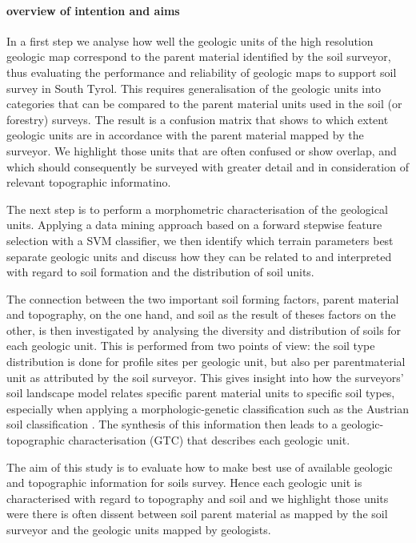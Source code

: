 \documentclass[preprint,12pt,authoryear]{elsarticle}
\begin{document}
\paragraph{overview of intention and aims}
In a first step we analyse how well the geologic units of the high resolution geologic map correspond to the parent material identified by the soil surveyor, thus evaluating the performance and reliability of geologic maps to support soil survey in South Tyrol. This requires generalisation of the geologic units into categories that can be compared to the parent material units used in the soil (or forestry) surveys. The result is a confusion matrix that shows to which extent geologic units are in accordance with the parent material mapped by the surveyor.  We highlight those units that are often confused or show overlap, and which should consequently be surveyed with greater detail and in consideration of relevant topographic informatino.

The next step is to perform a morphometric characterisation of the geological units. Applying a data mining approach based on a forward stepwise feature selection with a SVM classifier, we then identify which terrain parameters best separate geologic units and discuss how they can be related to and interpreted with regard to soil formation and the distribution of soil units.

The connection between the two important soil forming factors, parent material and topography, on the one hand, and soil as the result of theses factors on the other, is then investigated by analysing the diversity and distribution of soils for each geologic unit. This is performed from two points of view: the soil type distribution is done for profile sites per geologic unit, but also per parentmaterial unit as attributed by the soil surveyor. This gives insight into how the surveyors' soil landscape model relates specific parent material units to specific soil types, especially when applying a morphologic-genetic classification such as the Austrian soil classification \citep{Nestroy2011}. The synthesis of this information then leads to a geologic-topographic characterisation (GTC) that describes each geologic unit. 

The aim of this study is to evaluate how to make best use of available geologic and topographic information for soils survey. Hence each geologic unit is characterised with regard to topography and soil and we highlight those units were there is often dissent between soil parent material as mapped by the soil surveyor and the geologic units mapped by geologists.
\end{document}
